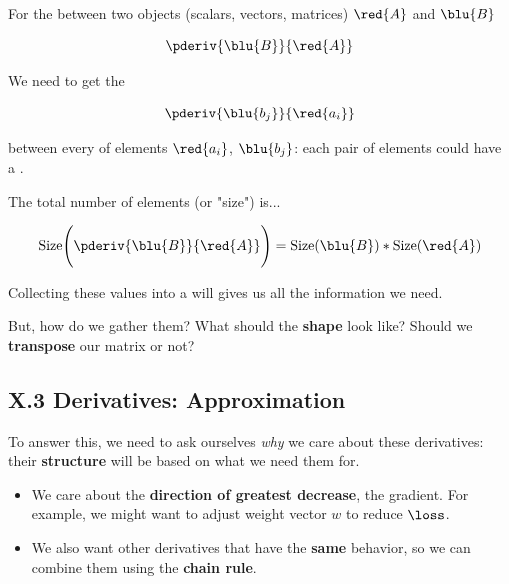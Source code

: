         \begin{concept}
            For the  between two objects (scalars, vectors, matrices) $\red{A}$ and $\blu{B}$
            
            \begin{equation*}
                \pderiv{\blu{B}}{\red{A}}
            \end{equation*}
            
            We need to get the 
            
            \begin{equation*}
                \pderiv{\blu{b_j}}{\red{a_i}}
            \end{equation*}
            
            between every  of elements $\red{a_i}$, $\blu{b_j}$: each pair of elements could have a .
            
            The total number of elements (or "size") is...
            
            \begin{equation*}
                \text{Size}\Bigg(  \pderiv{\blu{B}}{\red{A}}  \Bigg) 
                = 
                \text{Size}(\blu{B})
                *
                \text{Size}(\red{A})
            \end{equation*}
            
            Collecting these values into a  will gives us all the information we need.
        \end{concept}
        
        But, how do we gather them? What should the \textbf{shape} look like? Should we \textbf{transpose} our matrix or not?
    
    \secdiv
    
    \subsection*{X.3 \quad Derivatives: Approximation}
        
        To answer this, we need to ask ourselves \textit{why} we care about these derivatives: their \textbf{structure} will be based on what we need them for.
        
        \begin{itemize}
            \item We care about the \textbf{direction of greatest decrease}, the gradient. For example, we might want to adjust weight vector $w$ to reduce $\loss$.
            
            \item We also want other derivatives that have the \textbf{same} behavior, so we can combine them using the \textbf{chain rule}.
        \end{itemize}
        
